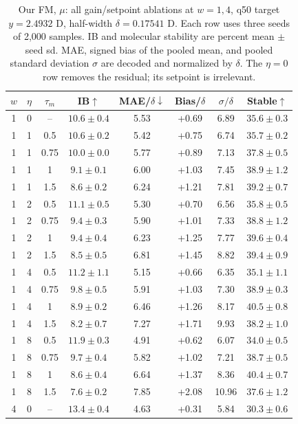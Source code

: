 \documentclass{article}
\begin{document}
\clearpage
\begin{table}[!htbp]
\centering\small
\caption{Our FM, $\mu$: all gain/setpoint ablations at $w=1,4$, q50 target $y=2.4932$ D, half-width $\delta=0.17541$ D. Each row uses three seeds of 2,000 samples. IB and molecular stability are percent mean $\pm$ seed sd. MAE, signed bias of the pooled mean, and pooled standard deviation $\sigma$ are decoded and normalized by $\delta$. The $\eta=0$ row removes the residual; its setpoint is irrelevant.}
\label{tab:grid-fm-mu}
\begin{tabular}{cccccccc}
\toprule
$w$ & $\eta$ & $\tau_m$ & IB$\uparrow$ & MAE/$\delta\downarrow$ & Bias/$\delta$ & $\sigma/\delta$ & Stable$\uparrow$\\
\midrule
1 & 0 & -- & $10.6\pm0.4$ & 5.53 & +0.69 & 6.89 & $35.6\pm0.3$\\
1 & 1 & 0.5 & $10.6\pm0.2$ & 5.42 & +0.75 & 6.74 & $35.7\pm0.2$\\
1 & 1 & 0.75 & $10.0\pm0.0$ & 5.77 & +0.89 & 7.13 & $37.8\pm0.5$\\
1 & 1 & 1 & $9.1\pm0.1$ & 6.00 & +1.03 & 7.45 & $38.9\pm1.2$\\
1 & 1 & 1.5 & $8.6\pm0.2$ & 6.24 & +1.21 & 7.81 & $39.2\pm0.7$\\
1 & 2 & 0.5 & $11.1\pm0.5$ & 5.30 & +0.70 & 6.56 & $35.8\pm0.5$\\
1 & 2 & 0.75 & $9.4\pm0.3$ & 5.90 & +1.01 & 7.33 & $38.8\pm1.2$\\
1 & 2 & 1 & $9.4\pm0.4$ & 6.23 & +1.25 & 7.77 & $39.6\pm0.4$\\
1 & 2 & 1.5 & $8.5\pm0.5$ & 6.81 & +1.45 & 8.82 & $39.4\pm0.9$\\
1 & 4 & 0.5 & $11.2\pm1.1$ & 5.15 & +0.66 & 6.35 & $35.1\pm1.1$\\
1 & 4 & 0.75 & $9.8\pm0.5$ & 5.91 & +1.03 & 7.30 & $38.9\pm0.3$\\
1 & 4 & 1 & $8.9\pm0.2$ & 6.46 & +1.26 & 8.17 & $40.5\pm0.8$\\
1 & 4 & 1.5 & $8.2\pm0.7$ & 7.27 & +1.71 & 9.93 & $38.2\pm1.0$\\
1 & 8 & 0.5 & $11.9\pm0.3$ & 4.91 & +0.62 & 6.07 & $34.0\pm0.5$\\
1 & 8 & 0.75 & $9.7\pm0.4$ & 5.82 & +1.02 & 7.21 & $38.7\pm0.5$\\
1 & 8 & 1 & $8.6\pm0.4$ & 6.64 & +1.37 & 8.36 & $40.4\pm0.7$\\
1 & 8 & 1.5 & $7.6\pm0.2$ & 7.85 & +2.08 & 10.96 & $37.6\pm1.2$\\
\midrule
4 & 0 & -- & $13.4\pm0.4$ & 4.63 & +0.31 & 5.84 & $30.3\pm0.6$\\

\end{tabular}
\end{table}
\end{document}
